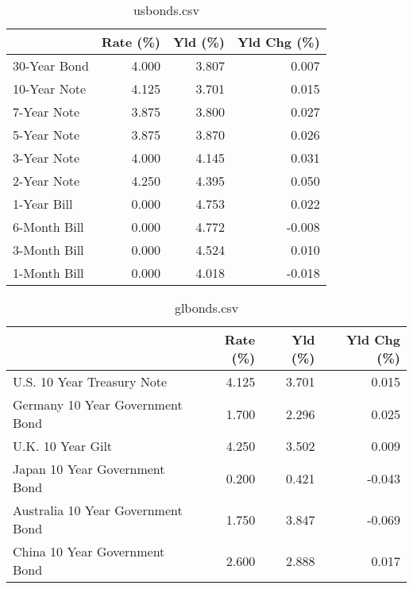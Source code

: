 \documentclass{article}%
\begin{document}
%


\begin{table}[htbp]%
\caption{usbonds.csv}%
\centering%
\begin{adjustbox}{width=1\textwidth}%
\begin{tabular}{lrrr}
\toprule
             &  Rate (\%) &  Yld (\%) &  Yld Chg (\%) \\
\midrule
30-Year Bond &     4.000 &    3.807 &        0.007 \\
10-Year Note &     4.125 &    3.701 &        0.015 \\
 7-Year Note &     3.875 &    3.800 &        0.027 \\
 5-Year Note &     3.875 &    3.870 &        0.026 \\
 3-Year Note &     4.000 &    4.145 &        0.031 \\
 2-Year Note &     4.250 &    4.395 &        0.050 \\
 1-Year Bill &     0.000 &    4.753 &        0.022 \\
6-Month Bill &     0.000 &    4.772 &       -0.008 \\
3-Month Bill &     0.000 &    4.524 &        0.010 \\
1-Month Bill &     0.000 &    4.018 &       -0.018 \\
\bottomrule
\end{tabular}
%
\end{adjustbox}%
\end{table}

%


\begin{table}[htbp]%
\caption{glbonds.csv}%
\centering%
\begin{adjustbox}{width=1\textwidth}%
\begin{tabular}{lrrr}
\toprule
                                  &  Rate (\%) &  Yld (\%) &  Yld Chg (\%) \\
\midrule
       U.S. 10 Year Treasury Note &     4.125 &    3.701 &        0.015 \\
  Germany 10 Year Government Bond &     1.700 &    2.296 &        0.025 \\
                U.K. 10 Year Gilt &     4.250 &    3.502 &        0.009 \\
    Japan 10 Year Government Bond &     0.200 &    0.421 &       -0.043 \\
Australia 10 Year Government Bond &     1.750 &    3.847 &       -0.069 \\
    China 10 Year Government Bond &     2.600 &    2.888 &        0.017 \\
\bottomrule
\end{tabular}
%
\end{adjustbox}%
\end{table}
\end{document}
